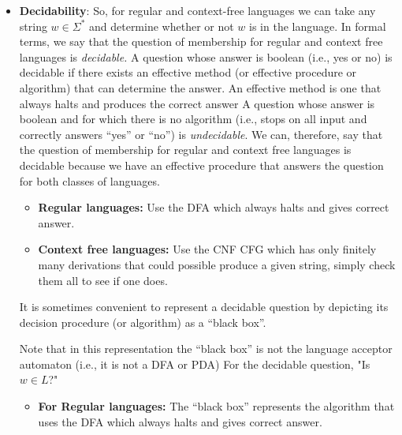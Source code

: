 \documentclass{report}
\begin{document}
\begin{itemize}
\begin{enumerate}
            \end{enumerate}
        \item \textbf{Decidability}: So, for regular and context-free languages we can take any string $w \in \Sigma^{*}$ and determine whether or not $w$ is in the language.
            \bigbreak \noindent 
            In formal terms, we say that the question of membership for regular and context free languages is \textit{decidable.}
            \bigbreak \noindent 
            A question whose answer is boolean (i.e., yes or no) is decidable if there exists an effective method (or effective procedure or algorithm) that can determine the answer.
            \bigbreak \noindent 
            An effective method is one that always halts and produces the correct answer
            \bigbreak \noindent 
            A question whose answer is boolean and for which there is no algorithm (i.e., stops on all input and correctly answers “yes” or “no”) is \textit{undecidable}.
            \bigbreak \noindent 
            We can, therefore, say that the question of membership for regular and context free languages is decidable because we have an effective procedure that answers the question for both classes of languages.
            \begin{itemize}
                \item \textbf{Regular languages:} Use the DFA which always halts and gives correct answer.
                \item \textbf{Context free languages:} Use the CNF CFG which has only finitely many derivations that could possible produce a given string, simply check them all to see if one does.
            \end{itemize}
            \bigbreak \noindent 
            It is sometimes convenient to represent a decidable question by depicting its decision procedure (or algorithm) as a “black box”.
            \bigbreak \noindent 
            \begin{figure}[ht]
                \centering
                \label{fig:chekc1}
            \end{figure}
            \bigbreak \noindent 
            Note that in this representation the “black box” is not the language acceptor automaton (i.e., it is not a DFA or PDA)
            \bigbreak \noindent 
            For the decidable question, "Is $w\in L $?"
            \begin{itemize}
                \item \textbf{For Regular languages:} The “black box” represents the algorithm that uses the DFA which always halts and gives correct answer.

\end{itemize}
\end{itemize}
\end{document}
